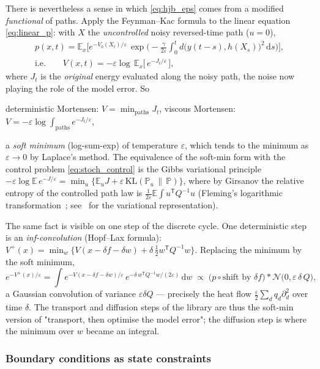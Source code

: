 \documentclass[11pt,a4paper]{article}
\newcommand{\dd}{\,\mathrm{d}}
\newcommand{\T}{^{\mathsf T}}
\newcommand{\eps}{\varepsilon}
\theoremstyle{plain}
\theoremstyle{definition}
\theoremstyle{remark}
\begin{document}
There is nevertheless a sense in which \eqref{eq:hjb_eps} comes from a modified \emph{functional} of paths. Apply the Feynman--Kac formula to the linear equation \eqref{eq:linear_p}: with $X$ the \emph{uncontrolled} noisy reversed-time path ($u=0$),
\begin{gather*}
  p(x,t) = \mathbb E_x\Big[ e^{-V_0(X_t)/\eps}\, \exp\Big(-\frac{\gamma}{2\eps}\int_0^t d\big(y(t-s),h(X_s)\big)^2\dd s\Big)\Big],\\
  \text{i.e.}\qquad V(x,t) = -\eps\log\,\mathbb E_x\big[\, e^{-J_t/\eps}\,\big],
\end{gather*}
where $J_t$ is the \emph{original} energy evaluated along the noisy path, the noise now playing the role of the model error. So
\begin{center}
  deterministic Mortensen: $V=\displaystyle\min_{\text{paths}} J_t$, \qquad
  viscous Mortensen: $V = -\eps\log\displaystyle\int_{\text{paths}} e^{-J_t/\eps}$,
\end{center}
a \emph{soft minimum} (log-sum-exp) of temperature $\eps$, which tends to the minimum as $\eps\to0$ by Laplace's method. The equivalence of the soft-min form with the control problem \eqref{eq:stoch_control} is the Gibbs variational principle $-\eps\log\mathbb E\,e^{-J/\eps} = \min_u\{\mathbb E_u J + \eps\,\mathrm{KL}(\mathbb P_u\,\|\,\mathbb P)\}$, where by Girsanov the relative entropy of the controlled path law is $\frac{1}{2\eps}\mathbb E\!\int u\T Q^{-1}u$ (Fleming's logarithmic transformation~\cite{FlemingMitter1982}; see~\cite{BoueDupuis1998} for the variational representation).

The same fact is visible on one step of the discrete cycle. One deterministic step is an \emph{inf-convolution} (Hopf--Lax formula): $V^+(x) = \min_w\{V(x-\delta f-\delta w) + \delta\,\tfrac12 w\T Q^{-1}w\}$. Replacing the minimum by the soft minimum,
\[
  e^{-V^+(x)/\eps} = \int e^{-V(x-\delta f-\delta w)/\eps}\, e^{-\delta\, w\T Q^{-1}w/(2\eps)}\dd w
  \;\propto\; \big(p\circ\text{shift by }\delta f\big) * \mathcal N\big(0,\eps\,\delta\,Q\big),
\]
a Gaussian convolution of variance $\eps\delta Q$ --- precisely the heat flow $\tfrac{\eps}{2}\sum_d q_d\partial_d^2$ over time $\delta$. The transport and diffusion steps of the library are thus the soft-min version of "transport, then optimise the model error"; the diffusion step is where the minimum over $w$ became an integral.

\subsubsection{Boundary conditions as state constraints}
\label{sec:bc}
\end{document}
